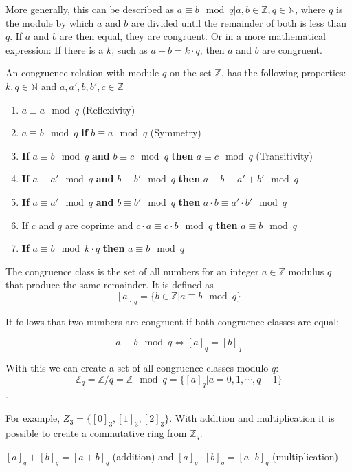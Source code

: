 More generally, this can be described as $a \equiv b \mod q | a,b \in \mathbb{Z}, q \in \mathbb{N}$, where $q$ is the module by which $a$ and $b$ are divided until the remainder of both is less than $q$. If $a$ and $b$ are then equal, they are congruent. Or in a more mathematical expression: If there is a $k$, such as $a-b = k\cdot q$, then $a$ and $b$ are congruent.

An congruence relation with module $q$ on the set $\mathbb{Z}$, has the following properties:
$k,q \in \mathbb{N}$ and $a, a', b, b', c \in \mathbb{Z}$
\begin{enumerate}
  \item $a \equiv a \mod q$ (Reflexivity)
  \item $a \equiv b \mod q$ \textbf{if} $b \equiv a \mod q$ (Symmetry)
  \item \textbf{If} $a \equiv b \mod q$ \textbf{and} $b \equiv c \mod q$ \textbf{then} $a \equiv c \mod q$ (Transitivity)
  \item \textbf{If} $a \equiv a' \mod q$ \textbf{and} $b \equiv b' \mod q$ \textbf{then} $a+b \equiv a'+b' \mod q$
  \item \textbf{If} $a \equiv a' \mod q$ \textbf{and} $b \equiv b' \mod q$ \textbf{then} $a\cdot b \equiv a'\cdot b' \mod q$
  \item If $c$ and $q$ are coprime and $c \cdot a \equiv c \cdot b \mod q$ \textbf{then} $a \equiv b \mod q$
  \item \textbf{If} $a \equiv b \mod k\cdot q$ \textbf{then} $a \equiv b \mod q$
\end{enumerate}

The congruence class is the set of all numbers for an integer $a \in \mathbb{Z}$ modulus $q$ that produce the same remainder. It is defined as
$$[a]_q = \{b \in \mathbb{Z} | a \equiv b \mod q\}$$

It follows that two numbers are congruent if both congruence classes are equal:

$$a \equiv b \mod q \Leftrightarrow [a]_q = [b]_q$$

With this we can create a set of all congruence classes modulo $q$:
$$\mathbb{Z}_q = \mathbb{Z}/q = \mathbb{Z} \mod q = \{[a]_q | a = 0, 1, \cdots, q-1 \}$$.

For example, $Z_3 = \{[0]_3, [1]_3, [2]_3\}$. With addition and multiplication it is possible to create a commutative ring from $\mathbb{Z}_q$.
\begin{center}
  $[a]_q + [b]_q = [a+b]_q$ (addition) and $[a]_q \cdot [b]_q = [a\cdot b]_q$ (multiplication)
\end{center}

